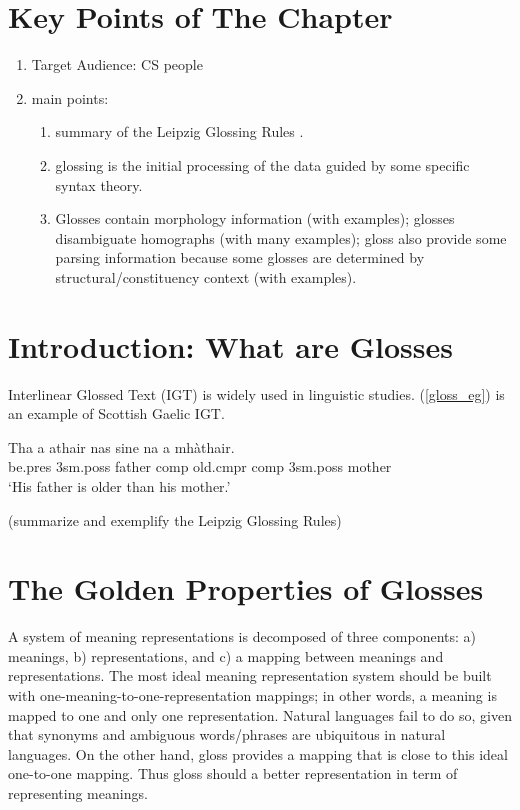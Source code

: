 \documentclass[final]{ua-thesis}
\numberwithin{equation}{section}
\begin{document}
\section{Key Points of The Chapter}
	\begin{enumerate}
	\item Target Audience: CS people
	\item main points:
		\begin{enumerate}
    	\item summary of the Leipzig Glossing Rules \citep{bickel2008leipzig}.  
		\item glossing is the initial processing of the data guided by some specific syntax theory. 
    	\item Glosses contain morphology information (with examples); glosses disambiguate homographs (with many examples); gloss also provide some parsing information because some glosses are determined by structural/constituency context (with examples).       
		\end{enumerate}
 
	\end{enumerate}

\section{Introduction: What are Glosses}

Interlinear Glossed Text (IGT) is widely used in linguistic studies. (\ref{gloss_eg})  is an example of Scottish Gaelic IGT.
\begin{exe}  
\ex\label{gloss_eg} \gll    Tha a athair nas sine na a mh\`athair.\\  
            be.pres 3sm.poss father comp old.cmpr comp 3sm.poss mother
\\  
    \glt    `His father is older than his mother.'  
\end{exe}

(summarize and exemplify the Leipzig Glossing Rules)


\section{The Golden Properties of Glosses}

A system of meaning representations is decomposed of three components: a) meanings, b) representations, and c) a mapping between meanings and representations. The most ideal meaning representation system should be built with one-meaning-to-one-representation mappings; in other words, a meaning is mapped to one and only one representation. Natural languages fail to do so, given that synonyms and ambiguous words/phrases are ubiquitous in natural languages. On the other hand, gloss provides a mapping that is close to this ideal one-to-one mapping. Thus gloss should a better representation in term of representing meanings. 
\end{document}

